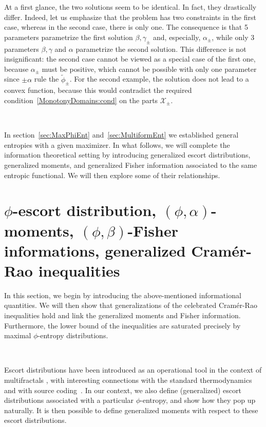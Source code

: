 \documentclass[entropy,article,submit,moreauthors,pdftex]{Definitions/mdpi}
\def\X{\mathcal{X}}
\begin{document}
At  a first  glance, the  two solutions  seem to  be identical.   In fact,  they
drastically  differ.   Indeed,  let  us  emphasize  that  the  problem  has  two
constraints in the  first case, whereas in  the second case, there  is only one.
The  consequence is  that 5  parameters parametrize  the first  solution $\beta,
\gamma_\pm$  and,  especially, $\alpha_\pm$,  while  only  3 parameters  $\beta,
\gamma$ and  $\alpha$ parametrize the  second solution.  This difference  is not
insignificant: the second case  cannot be viewed as a special  case of the first
one, because $\alpha_\pm$  must be positive, which cannot be  possible with only
one parameter since $\pm \alpha$ rule the $\widetilde{\phi}_\pm$. For the second
example, the  solution does not  lead to a  convex function, because  this would
contradict  the  required   condition~\ref{MonotonyDomains:cond}  on  the  parts
$\X_\pm$.

\

In section~\ref{sec:MaxPhiEnt} and~\ref{sec:MultiformEnt} we established general
entropies  with a  given  maximizer.   In what  follows,  we  will complete  the
information theoretical setting by introducing generalized escort distributions,
generalized moments, and  generalized Fisher information associated  to the same
entropic functional. We will then explore some of their relationships.




\section{$\phi$-escort           distribution,          $(\phi,\alpha)$-moments,
  $(\phi,\beta)$-Fisher informations,  generalized Cram\'er-Rao inequalities}
\label{sec:EscortCR}

In  this section,  we  begin by  introducing  the above-mentioned  informational
quantities.   We  will   then  show  that  generalizations   of  the  celebrated
Cram\'er-Rao  inequalities hold  and  link the  generalized  moments and  Fisher
information.  Furthermore,  the lower  bound of  the inequalities  are saturated
precisely by maximal $\phi$-entropy distributions.

\

Escort distributions have been introduced as  an operational tool in the context
of multifractals  \cite{ChhJen89, BecSch93},  with interesting  connections with
the  standard thermodynamics~\cite{Nau11}  and  with source  coding~\cite{Cam65,
  Ber09}.  In our  context, we  also define  (generalized) escort  distributions
associated with a particular $\phi$-entropy, and show how they pop up naturally.
It is then  possible to define generalized moments with  respect to these escort
distributions.
\end{document}
